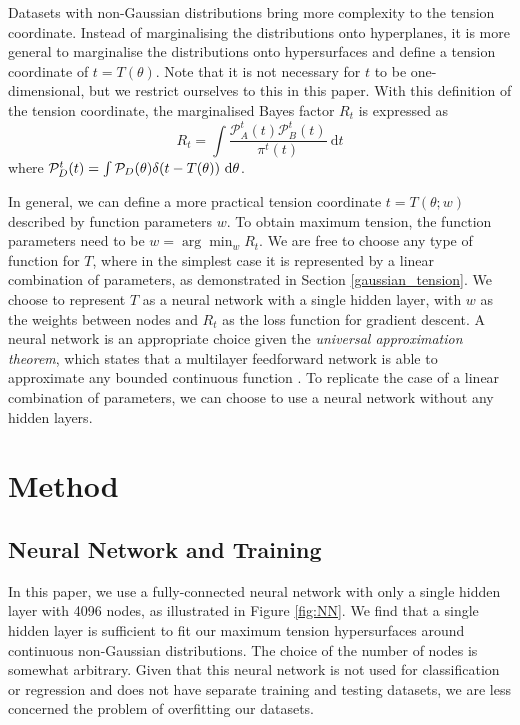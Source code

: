 \documentclass[%
 reprint,
 amsmath,amssymb,
 aps,
]{revtex4-2}
\begin{document}
Datasets with non-Gaussian distributions bring more complexity to the tension coordinate. Instead of marginalising the distributions onto hyperplanes, it is more general to marginalise the distributions onto hypersurfaces and define a tension coordinate of $t = T(\theta)$. Note that it is not necessary for $t$ to be one-dimensional, but we restrict ourselves to this in this paper. With this definition of the tension coordinate, the marginalised Bayes factor $R_t$ is expressed as
\begin{equation} \label{margin_R}
    R_t = \int \frac{\mathcal{P}_A^{t}(t) \mathcal{P}_B^{t}(t)}{\pi^{t}(t)} \ \textrm{d}t
\end{equation}
where $\mathcal{P}_D^{t}(t) = \int \mathcal{P}_D(\theta) \delta(t - T(\theta)) \ \rm{d}\theta$.

In general, we can define a more practical tension coordinate $t = T(\theta; w)$ described by function parameters $w$. To obtain maximum tension, the function parameters need to be $w = \arg \min_w R_t$. We are free to choose any type of function for $T$, where in the simplest case it is represented by a linear combination of parameters, as demonstrated in Section \ref{gaussian_tension}. We choose to represent $T$ as a neural network with a single hidden layer, with $w$ as the weights between nodes and $R_t$ as the loss function for gradient descent. A neural network is an appropriate choice given the \textit{universal approximation theorem}, which states that a multilayer feedforward network is able to approximate any bounded continuous function \cite{Hornik1989}. To replicate the case of a linear combination of parameters, we can choose to use a neural network without any hidden layers.


\section{Method}

\subsection{Neural Network and Training}

In this paper, we use a fully-connected neural network with only a single hidden layer with 4096 nodes, as illustrated in Figure \ref{fig:NN}. We find that a single hidden layer is sufficient to fit our maximum tension hypersurfaces around continuous non-Gaussian distributions. The choice of the number of nodes is somewhat arbitrary. Given that this neural network is not used for classification or regression and does not have separate training and testing datasets, we are less concerned the problem of overfitting our datasets. 
\end{document}
